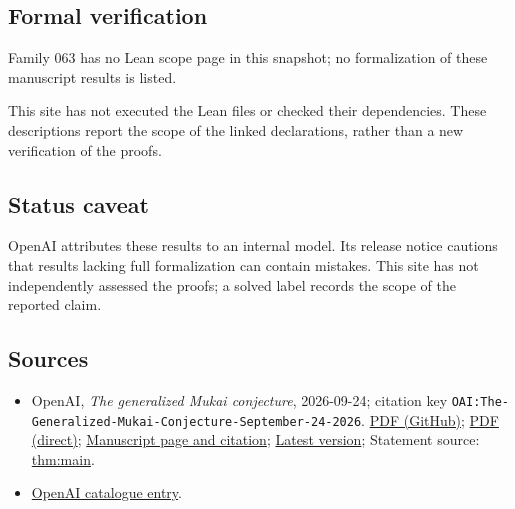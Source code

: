 \documentclass[11pt]{article}
\begin{document}
\subsection{Formal verification}
Family 063 has no Lean scope page in this snapshot; no formalization of these manuscript results is listed.

This site has not executed the Lean files or checked their dependencies. These descriptions report the scope of the linked declarations, rather than a new verification of the proofs.

\subsection{Status caveat}
OpenAI attributes these results to an internal model. Its release notice cautions that results lacking full formalization can contain mistakes. This site has not independently assessed the proofs; a solved label records the scope of the reported claim.

\subsection{Sources}
\begin{itemize}
\item OpenAI, \emph{The generalized Mukai conjecture}, 2026-09-24; citation key \texttt{OAI:The-Generalized-Mukai-Conjecture-September-24-2026}. \href{https://github.com/openai/math/blob/adc7f1241b42e322a6451854ab7e4b4c146bf78a/preprints/The-Generalized-Mukai-Conjecture-September-24-2026/article.pdf}{PDF (GitHub)}; \href{https://github.com/openai/math/raw/adc7f1241b42e322a6451854ab7e4b4c146bf78a/preprints/The-Generalized-Mukai-Conjecture-September-24-2026/article.pdf}{PDF (direct)}; \href{https://github.com/openai/math/blob/adc7f1241b42e322a6451854ab7e4b4c146bf78a/preprints/The-Generalized-Mukai-Conjecture-September-24-2026/README.md}{Manuscript page and citation}; \href{https://github.com/openai/math/blob/main/preprints/The-Generalized-Mukai-Conjecture-September-24-2026/article.pdf}{Latest version}; Statement source: \href{https://github.com/openai/math/blob/adc7f1241b42e322a6451854ab7e4b4c146bf78a/preprints/The-Generalized-Mukai-Conjecture-September-24-2026/build/sections/introduction.tex\#L22}{thm:main}.
\item \href{https://github.com/openai/math/blob/adc7f1241b42e322a6451854ab7e4b4c146bf78a/CONTENTS.md}{OpenAI catalogue entry}.
\end{itemize}
\end{document}
